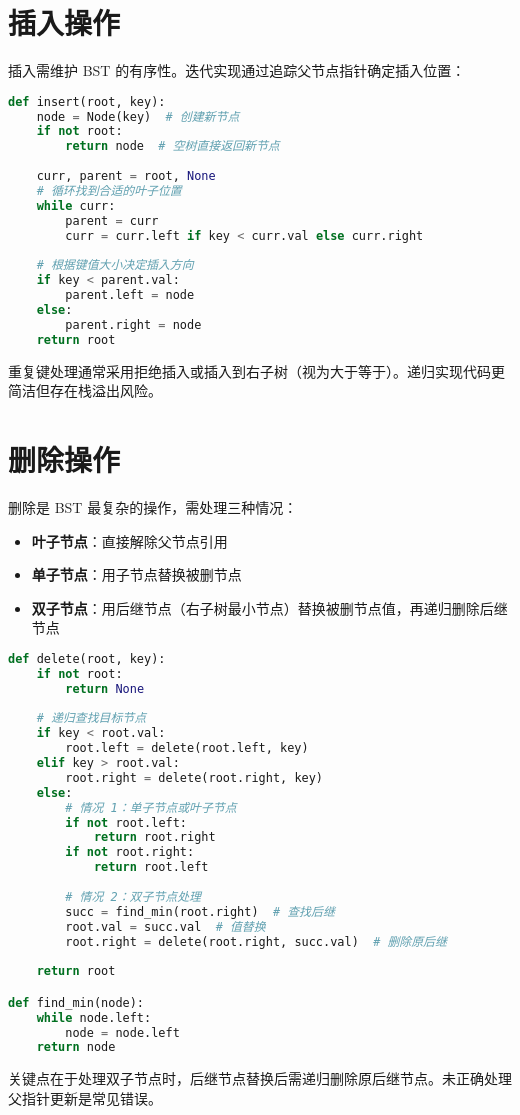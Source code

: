 \section{插入操作}
插入需维护 BST 的有序性。迭代实现通过追踪父节点指针确定插入位置：\par
\begin{lstlisting}[language=python]
def insert(root, key):
    node = Node(key)  # 创建新节点
    if not root: 
        return node  # 空树直接返回新节点
    
    curr, parent = root, None
    # 循环找到合适的叶子位置
    while curr:
        parent = curr
        curr = curr.left if key < curr.val else curr.right
    
    # 根据键值大小决定插入方向
    if key < parent.val:
        parent.left = node
    else:
        parent.right = node
    return root
\end{lstlisting}
重复键处理通常采用拒绝插入或插入到右子树（视为大于等于）。递归实现代码更简洁但存在栈溢出风险。\par
\section{删除操作}
删除是 BST 最复杂的操作，需处理三种情况：\par
\begin{itemize}
\item \textbf{叶子节点}：直接解除父节点引用
\item \textbf{单子节点}：用子节点替换被删节点
\item \textbf{双子节点}：用后继节点（右子树最小节点）替换被删节点值，再递归删除后继节点
\end{itemize}
\begin{lstlisting}[language=python]
def delete(root, key):
    if not root: 
        return None
    
    # 递归查找目标节点
    if key < root.val:
        root.left = delete(root.left, key)
    elif key > root.val:
        root.right = delete(root.right, key)
    else:
        # 情况 1：单子节点或叶子节点
        if not root.left:
            return root.right
        if not root.right:
            return root.left
        
        # 情况 2：双子节点处理
        succ = find_min(root.right)  # 查找后继
        root.val = succ.val  # 值替换
        root.right = delete(root.right, succ.val)  # 删除原后继
    
    return root

def find_min(node):
    while node.left:
        node = node.left
    return node
\end{lstlisting}
关键点在于处理双子节点时，后继节点替换后需递归删除原后继节点。未正确处理父指针更新是常见错误。\par
